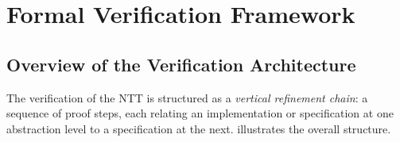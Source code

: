
\chapter{Formal Verification Framework}
\label{ch:formal_framework}

\section{Overview of the Verification Architecture}

The verification of the \haetae{} NTT is structured as a
\emph{vertical refinement chain}: a sequence of proof steps, each relating
an implementation or specification at one abstraction level to a
specification at the next.   illustrates the overall structure.

